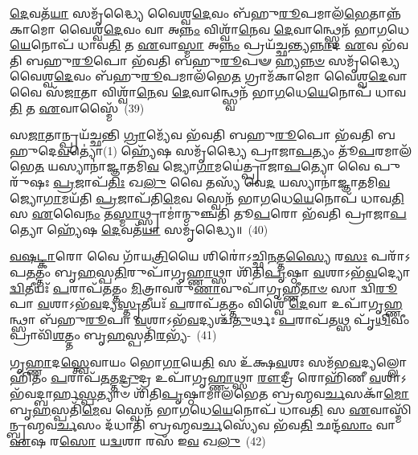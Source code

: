 \-\ul{𑌦𑍇}\-𑌵𑌤᳴\-\ul{𑌯𑌾} 𑌸𑌮𑍃᳴𑌦𑍍𑌧𑍍𑌯𑍈 𑌵𑍈𑌶𑍍𑌵\-\ul{𑌦𑍇}\-𑌵𑌂 𑌬᳴𑌹𑍁\-\ul{𑌰𑍂}\-𑌪𑌮𑌾𑌲᳴\-\ul{𑌭𑍇}\-𑌤𑌾𑌨𑍍𑌨᳴𑌕𑌾𑌮𑍋 𑌵𑍈𑌶𑍍𑌵\-\ul{𑌦𑍇}\-𑌵𑌂 𑌵𑌾 𑌅\-\ul{𑌨𑍍𑌨𑌂} 𑌵𑌿𑌶𑍍𑌵𑌾᳴\-\ul{𑌨𑍇}\-𑌵 \ul{𑌦𑍇}\-𑌵𑌾𑌨𑍍𑌥𑍍𑌸𑍍𑌵𑍇𑌨᳴ 𑌭𑌾\-\ul{𑌗}\-𑌧𑍇\-\ul{𑌯𑍇}\-𑌨𑍋𑌪᳴ 𑌧𑌾𑌵\-\ul{𑌤𑌿} 𑌤 \ul{𑌏}\-𑌵𑌾\-\ul{𑌸𑍍𑌮𑌾} 𑌅\-\ul{𑌨𑍍𑌨𑌂} 𑌪𑍍𑌰𑌯᳴𑌚𑍍𑌛𑌨𑍍𑌤𑍍𑌯\-\ul{𑌨𑍍𑌨𑌾}\-𑌦 \ul{𑌏}\-𑌵 𑌭᳴𑌵𑌤𑌿 𑌬𑌹𑍁\-\ul{𑌰𑍂}\-𑌪𑍋 𑌭᳴𑌵𑌤𑌿 𑌬𑌹𑍁\-\ul{𑌰𑍂}\-𑌪𑍟 𑌹𑍍𑌯\-\ul{𑌨𑍍𑌨}\-\-\ul{𑍞} 𑌸𑌮𑍃᳴𑌦𑍍𑌧𑍍𑌯𑍈 𑌵𑍈𑌶𑍍𑌵\-\ul{𑌦𑍇}\-𑌵𑌂 𑌬᳴𑌹𑍁\-\ul{𑌰𑍂}\-𑌪𑌮𑌾\-𑌲᳴𑌭𑍇\-\ul{𑌤} 𑌗𑍍𑌰𑌾𑌮᳴𑌕𑌾𑌮𑍋 𑌵𑍈𑌶𑍍𑌵\-\ul{𑌦𑍇}\-𑌵𑌾 𑌵𑍈 𑌸᳴\-\ul{𑌜𑌾}\-𑌤𑌾 𑌵𑌿𑌶𑍍𑌵𑌾᳴\-\ul{𑌨𑍇}\-𑌵 \ul{𑌦𑍇}\-𑌵𑌾𑌨𑍍𑌥𑍍𑌸𑍍𑌵𑍇𑌨᳴ 𑌭𑌾\-\ul{𑌗}\-𑌧𑍇\-\ul{𑌯𑍇}\-𑌨𑍋𑌪᳴ 𑌧𑌾𑌵\-\ul{𑌤𑌿} 𑌤 \ul{𑌏}\-𑌵𑌾𑌸𑍍𑌮𑍈᳴~(39)

𑌸\-\ul{𑌜𑌾}\-𑌤𑌾𑌨𑍍𑌪𑍍𑌰𑌯᳴𑌚𑍍𑌛𑌨𑍍𑌤𑌿 \ul{𑌗𑍍𑌰𑌾}\-𑌮𑍍𑌯𑍇᳴𑌵 𑌭᳴𑌵𑌤𑌿 𑌬𑌹𑍁\-\ul{𑌰𑍂}\-𑌪𑍋 𑌭᳴𑌵𑌤𑌿 𑌬𑌹𑍁𑌦𑍇\-\ul{𑌵}\-𑌤𑍍𑌯𑍋॑(1॒) 𑌹𑍍𑌯𑍇᳴𑌷 𑌸𑌮𑍃᳴𑌦𑍍𑌧𑍍𑌯𑍈 𑌪𑍍𑌰𑌾𑌜𑌾\-\ul{𑌪}\-𑌤𑍍𑌯𑌂 𑌤𑍂᳴\-\ul{𑌪}\-𑌰𑌮𑌾\-𑌲᳴𑌭𑍇\-\ul{𑌤} 𑌯𑌸𑍍𑌯𑌾𑌨𑌾॑𑌜𑍍𑌞𑌾𑌤𑌮𑌿\-\ul{𑌵} 𑌜𑍍𑌯𑍋\-\ul{𑌗𑌾}\-𑌮𑌯𑍇॑𑌤𑍍𑌪𑍍𑌰𑌾𑌜𑌾\-\ul{𑌪}\-𑌤𑍍𑌯𑍋 𑌵𑍈 𑌪𑍁𑌰𑍁᳴𑌷𑌃 \ul{𑌪𑍍𑌰}\-𑌜𑌾𑌪᳴\-\ul{𑌤𑌿𑌃} 𑌖\-\ul{𑌲𑍁} 𑌵𑍈 𑌤𑌸𑍍𑌯᳴ 𑌵𑍇\-\ul{𑌦} 𑌯𑌸𑍍𑌯𑌾𑌨𑌾॑𑌜𑍍𑌞𑌾𑌤𑌮𑌿\-\ul{𑌵} 𑌜𑍍𑌯𑍋\-\ul{𑌗𑌾}\-𑌮𑌯᳴𑌤𑌿 \ul{𑌪𑍍𑌰}\-𑌜𑌾𑌪᳴𑌤𑌿\-\ul{𑌮𑍇}\-𑌵 𑌸𑍍𑌵𑍇𑌨᳴ 𑌭𑌾\-\ul{𑌗}\-𑌧𑍇\-\ul{𑌯𑍇}\-𑌨𑍋𑌪᳴ 𑌧𑌾𑌵\-\ul{𑌤𑌿} 𑌸 \ul{𑌏}\-𑌵𑍈\-\ul{𑌨𑌂} 𑌤\-\ul{𑌸𑍍𑌮𑌾}\-𑌥𑍍𑌸𑍍𑌰𑌾𑌮𑌾॑𑌨𑍍𑌮𑍁𑌞𑍍𑌚𑌤𑌿 𑌤𑍂\-\ul{𑌪}\-𑌰𑍋 𑌭᳴𑌵𑌤𑌿 𑌪𑍍𑌰𑌾𑌜𑌾\-\ul{𑌪}\-𑌤𑍍𑌯𑍋 𑌹𑍍𑌯𑍇᳴𑌷 \ul{𑌦𑍇}\-𑌵𑌤᳴\-\ul{𑌯𑌾} 𑌸𑌮𑍃᳴𑌦𑍍𑌧𑍍𑌯𑍈॥~(40)

{\anuvakamend[{\-\ul{𑌅}\-\-\ul{𑌸𑍍𑌮𑌾} 𑌇𑌨𑍍𑌦𑍍𑌰᳴\-\ul{𑌮𑍇}\-𑌵𑍈𑌷 𑌸᳴\-\ul{𑌜𑌾}\-𑌤𑌾 𑌵𑌿𑌶𑍍𑌵𑌾᳴\-\ul{𑌨𑍇}\-𑌵 \ul{𑌦𑍇}\-𑌵𑌾𑌨𑍍𑌥𑍍𑌸𑍍𑌵𑍇𑌨᳴ 𑌭𑌾\-\ul{𑌗}\-𑌧𑍇\-\ul{𑌯𑍇}\-𑌨𑍋𑌪᳴ 𑌧𑌾𑌵\-\ul{𑌤𑌿} 𑌤 \ul{𑌏}\-𑌵𑌾𑌸𑍍𑌮𑍈॑ 𑌪𑍍𑌰𑌾𑌜𑌾\-\ul{𑌪}\-𑌤𑍍𑌯𑍋 𑌹𑌿 𑌤𑍍𑌰𑍀𑌣𑌿᳴ 𑌚}]}%

\-\ul{𑌵}\-\-\ul{𑌷}\-\-\ul{𑌟𑍍𑌕𑌾}\-𑌰𑍋 𑌵𑍈 𑌗𑌾᳴𑌯\-\ul{𑌤𑍍𑌰𑌿}\-𑌯𑍈 𑌶𑌿𑌰𑍋॑\-𑌽𑌚𑍍𑌛𑌿\-\ul{𑌨}\-𑌤𑍍𑌤\-\ul{𑌸𑍍𑌯𑍈} 𑌰\-\ul{𑌸𑌃} 𑌪𑌰𑌾᳴\-𑌽𑌪\-\ul{𑌤}\-𑌤𑍍𑌤𑌂 𑌬𑍃\-\ul{𑌹}\-𑌸𑍍𑌪\-\ul{𑌤𑌿}\-𑌰𑍁𑌪𑌾᳴𑌗𑍃\-\ul{𑌹𑍍𑌣𑌾}\-𑌥𑍍𑌸𑌾 𑌶𑌿᳴𑌤𑌿\-\ul{𑌪𑍃}\-𑌷𑍍𑌠𑌾 \ul{𑌵}\-𑌶𑌾\-𑌽𑌭᳴\-\ul{𑌵}\-𑌦𑍍𑌯𑍋 \ul{𑌦𑍍𑌵𑌿}\-𑌤𑍀𑌯𑌃᳴ \ul{𑌪}\-𑌰𑌾𑌪᳴\-\ul{𑌤}\-𑌤𑍍𑌤𑌂 \ul{𑌮𑌿}\-𑌤𑍍𑌰𑌾𑌵𑌰𑍁᳴\-\ul{𑌣𑌾}\-𑌵𑍁𑌪𑌾᳴𑌗𑍃𑌹𑍍𑌣𑍀\-\ul{𑌤𑌾}\-\-\ul{𑍞} 𑌸𑌾 𑌦𑍍𑌵𑌿᳴\-\ul{𑌰𑍂}\-𑌪𑌾 \ul{𑌵}\-𑌶𑌾\-𑌽𑌭᳴\-\ul{𑌵}\-𑌦𑍍𑌯\-\ul{𑌸𑍍𑌤𑍃}\-𑌤𑍀𑌯𑌃᳴ \ul{𑌪}\-𑌰𑌾𑌪᳴\-\ul{𑌤}\-𑌤𑍍𑌤𑌂 𑌵𑌿𑌶𑍍𑌵𑍇᳴ \ul{𑌦𑍇}\-𑌵𑌾 𑌉𑌪𑌾᳴𑌗𑍃\-\ul{𑌹𑍍𑌣}\-𑌨𑍍𑌥𑍍𑌸𑌾 𑌬᳴𑌹𑍁\-\ul{𑌰𑍂}\-𑌪𑌾 \ul{𑌵}\-𑌶𑌾\-𑌽𑌭᳴\-\ul{𑌵}\-𑌦𑍍𑌯𑌶𑍍𑌚᳴\-\ul{𑌤𑍁}\-𑌰𑍍𑌥𑌃 \ul{𑌪}\-𑌰𑌾𑌪᳴\-\ul{𑌤}\-𑌥𑍍𑌸 𑌪𑍃᳴\-\ul{𑌥𑌿}\-𑌵𑍀𑌂 𑌪𑍍𑌰𑌾𑌵𑌿᳴\-\ul{𑌶}\-𑌤𑍍𑌤𑌂 𑌬𑍃\-\ul{𑌹}\-𑌸𑍍𑌪𑌤𑌿᳴\-\ul{𑌰}\-𑌭𑍍𑌯᳴-~(41)

𑌗𑍃\-\ul{𑌹𑍍𑌣𑌾}\-𑌦\-\ul{𑌸𑍍𑌤𑍍𑌵𑍇}\-𑌵𑌾𑌯𑌂 𑌭𑍋\-\ul{𑌗𑌾}\-𑌯𑍇\-\ul{𑌤𑌿} 𑌸 𑌉᳴𑌕𑍍𑌷\-\ul{𑌵}\-𑌶𑌃 𑌸𑌮᳴𑌭\-\ul{𑌵}\-𑌦𑍍𑌯𑌲𑍍𑌲𑍋𑌹𑌿᳴𑌤𑌂 \ul{𑌪}\-𑌰𑌾𑌪᳴\-\ul{𑌤}\-𑌤𑍍𑌤\-\ul{𑌦𑍍𑌰𑍁}\-𑌦𑍍𑌰 𑌉𑌪𑌾᳴𑌗𑍃\-\ul{𑌹𑍍𑌣𑌾}\-𑌥𑍍𑌸𑌾 \ul{𑌰𑍗}\-𑌦𑍍𑌰𑍀 𑌰𑍋𑌹𑌿᳴𑌣𑍀 \ul{𑌵}\-𑌶𑌾\-𑌽𑌭᳴𑌵\-𑌦𑍍𑌬𑌾𑌰𑍍\mbox{}𑌹\-\ul{𑌸𑍍𑌪}\-𑌤𑍍𑌯𑌾𑍞 𑌶𑌿᳴𑌤𑌿\-\ul{𑌪𑍃}\-𑌷𑍍𑌠𑌾𑌮𑌾𑌲᳴𑌭𑍇𑌤 𑌬𑍍𑌰𑌹𑍍𑌮𑌵\-\ul{𑌰𑍍𑌚}\-𑌸𑌕𑌾᳴\-\ul{𑌮𑍋} 𑌬𑍃\-\ul{𑌹}\-𑌸𑍍𑌪𑌤𑌿᳴\-\ul{𑌮𑍇}\-𑌵 𑌸𑍍𑌵𑍇𑌨᳴ 𑌭𑌾\-\ul{𑌗}\-𑌧𑍇\-\ul{𑌯𑍇}\-𑌨𑍋𑌪᳴ 𑌧𑌾𑌵\-\ul{𑌤𑌿} 𑌸 \ul{𑌏}\-𑌵𑌾𑌸𑍍𑌮𑌿᳴𑌨𑍍𑌬𑍍𑌰𑌹𑍍𑌮\-𑌵\-\ul{𑌰𑍍𑌚}\-𑌸𑌂 𑌦᳴𑌧𑌾𑌤𑌿 𑌬𑍍𑌰𑌹𑍍𑌮𑌵\-\ul{𑌰𑍍𑌚}\-𑌸𑍍𑌯𑍇᳴𑌵 𑌭᳴𑌵\-\ul{𑌤𑌿} 𑌛𑌨𑍍𑌦᳴\-\ul{𑌸𑌾𑌂} 𑌵𑌾 \ul{𑌏}\-𑌷 𑌰\-\ul{𑌸𑍋} 𑌯\-\ul{𑌦𑍍𑌵}\-𑌶𑌾 𑌰𑌸᳴ 𑌇\-\ul{𑌵} 𑌖\-\ul{𑌲𑍁}\-~(42)


